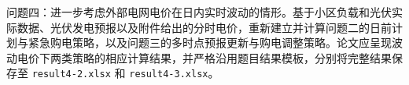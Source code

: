 问题四：进一步考虑外部电网电价在日内实时波动的情形。基于小区负载和光伏实际数据、光伏发电预报以及附件给出的分时电价，重新建立并计算问题二的日前计划与紧急购电策略，以及问题三的多时点预报更新与购电调整策略。论文应呈现波动电价下两类策略的相应计算结果，并严格沿用题目结果模板，分别将完整结果保存至 \texttt{result4-2.xlsx} 和 \texttt{result4-3.xlsx}。
